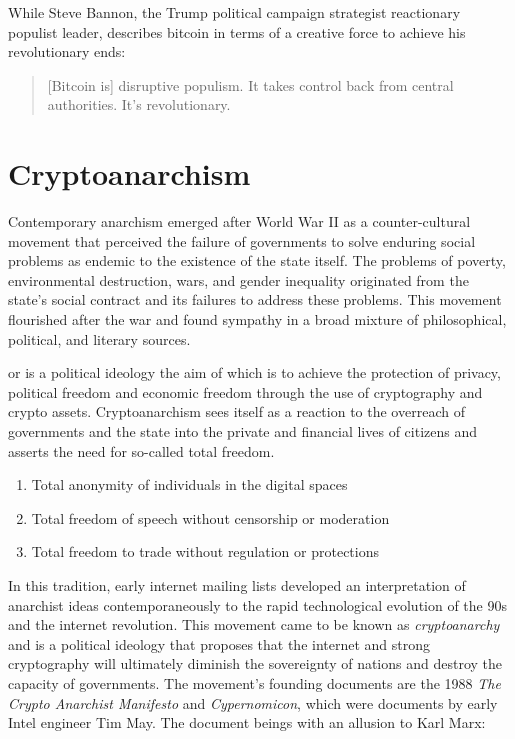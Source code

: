 While Steve Bannon, the Trump political campaign strategist reactionary populist
leader, describes bitcoin in terms of a creative force to achieve his
revolutionary ends:


\begin{quote}
[Bitcoin is] disruptive populism. It takes control back from central authorities.
It's revolutionary.
\end{quote}

\section{Cryptoanarchism}


Contemporary anarchism emerged after World War II as a counter-cultural movement
that perceived the failure of governments to solve enduring social problems as
endemic to the existence of the state itself. The problems of poverty,
environmental destruction, wars, and gender inequality originated from the
state's social contract and its failures to address these problems. This
movement flourished after the war and found sympathy in a broad mixture of
philosophical, political, and literary sources.

\cite{Cryptoanarchism} or \cite{cyberanarchism} is a political ideology the aim
of which is to achieve the protection of privacy, political freedom and economic
freedom through the use of cryptography and crypto assets. Cryptoanarchism sees
itself as a reaction to the overreach of governments and the state into the
private and financial lives of citizens and asserts the need for so-called total
freedom.

\begin{enumerate}
  \item Total anonymity of individuals in the digital spaces
  \item Total freedom of speech without censorship or moderation
  \item Total freedom to trade without regulation or protections
\end{enumerate}

In this tradition, early internet mailing lists developed an interpretation of
anarchist ideas contemporaneously to the rapid technological evolution of the
90s and the internet revolution. This movement came to be known as
\textit{cryptoanarchy} and is a political ideology that proposes that the
internet and strong cryptography will ultimately diminish the sovereignty of
nations and destroy the capacity of governments. The movement's founding
documents are the 1988 \textit{The Crypto Anarchist Manifesto} and
\textit{Cypernomicon}, which were documents by early Intel engineer Tim May. The
document beings with an allusion to Karl Marx:

